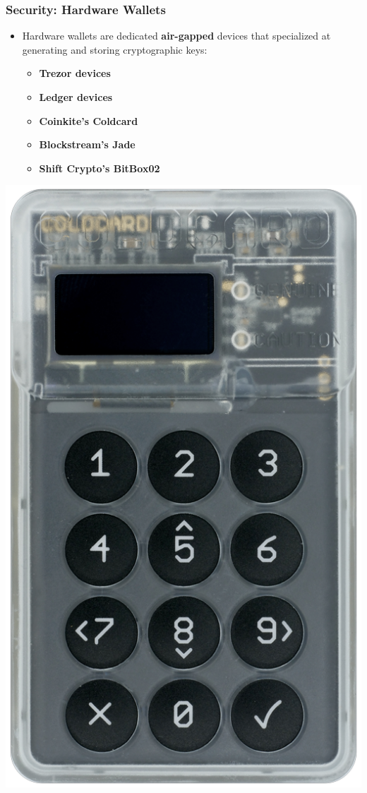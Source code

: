 \documentclass{beamer}
\begin{document}
\begin{frame}[fragile]
  \frametitle{Security: Hardware Wallets}
  \begin{minipage}{0.6\textwidth}\raggedright
    \begin{itemize}
    \item Hardware wallets are dedicated \textbf{air-gapped} devices that
      specialized at generating and storing cryptographic keys:
      \begin{itemize}
      \item \textbf{Trezor devices}
      \item \textbf{Ledger devices}
      \item \textbf{Coinkite's Coldcard}
      \item \textbf{Blockstream's Jade}
      \item \textbf{Shift Crypto's BitBox02}
      \end{itemize}
    \end{itemize}
  \end{minipage}
  \begin{minipage}{0.3\textwidth}\raggedleft
    \includegraphics[width=0.7\linewidth]{coldcard-front}
  \end{minipage}
\end{frame}
\end{document}
